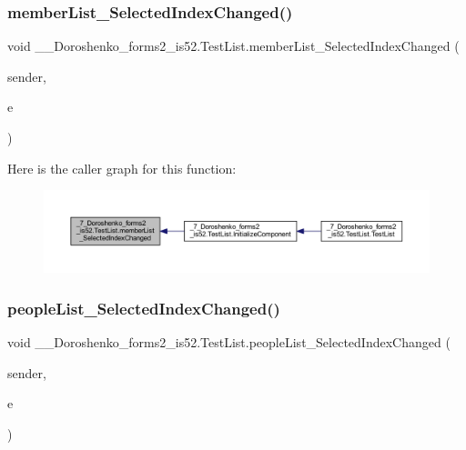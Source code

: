 \subsubsection{\texorpdfstring{member\+List\+\_\+\+Selected\+Index\+Changed()}{memberList\_SelectedIndexChanged()}}
{\footnotesize\ttfamily void \+\_\+\_\+\+Doroshenko\+\_\+forms2\+\_\+is52.\+Test\+List.\+member\+List\+\_\+\+Selected\+Index\+Changed (\begin{DoxyParamCaption}\item[{object}]{sender,  }\item[{Event\+Args}]{e }\end{DoxyParamCaption})\hspace{0.3cm}{\ttfamily [private]}}

Here is the caller graph for this function\+:
\nopagebreak
\begin{figure}[H]
\begin{center}
\leavevmode
\includegraphics[width=350pt]{class__7___doroshenko__forms2__is52_1_1_test_list_afa5f16b3df276bde3cefe54969bf5bed_icgraph}
\end{center}
\end{figure}
\hypertarget{class__7___doroshenko__forms2__is52_1_1_test_list_a266dce962f1c7c8a005ab5548e21c56a}{}\label{class__7___doroshenko__forms2__is52_1_1_test_list_a266dce962f1c7c8a005ab5548e21c56a} 
\subsubsection{\texorpdfstring{people\+List\+\_\+\+Selected\+Index\+Changed()}{peopleList\_SelectedIndexChanged()}}
{\footnotesize\ttfamily void \+\_\+\_\+\+Doroshenko\+\_\+forms2\+\_\+is52.\+Test\+List.\+people\+List\+\_\+\+Selected\+Index\+Changed (\begin{DoxyParamCaption}\item[{object}]{sender,  }\item[{Event\+Args}]{e }\end{DoxyParamCaption})\hspace{0.3cm}{\ttfamily [private]}}

